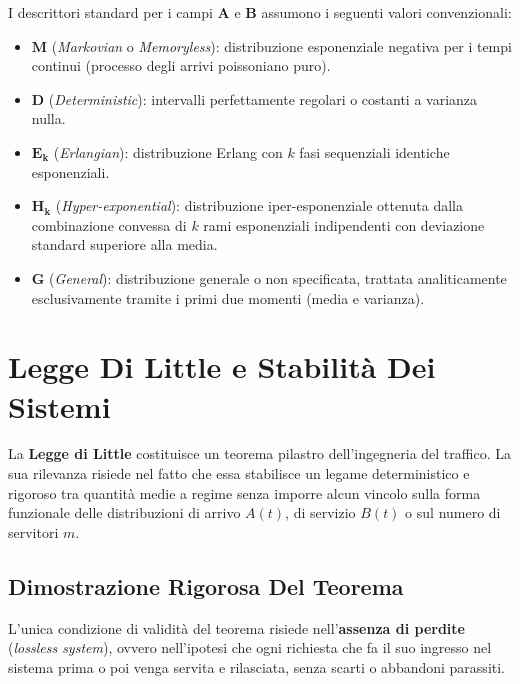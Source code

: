 \documentclass[11pt, a4paper]{article}
\begin{document}
I descrittori standard per i campi $\mathbf{A}$ e $\mathbf{B}$ assumono i seguenti valori convenzionali:
\begin{itemize}[leftmargin=*]
    \item $\mathbf{M}$ (\emph{Markovian} o \emph{Memoryless}): distribuzione esponenziale negativa per i tempi continui (processo degli arrivi poissoniano puro).
    \item $\mathbf{D}$ (\emph{Deterministic}): intervalli perfettamente regolari o costanti a varianza nulla.
    \item $\mathbf{E_k}$ (\emph{Erlangian}): distribuzione Erlang con $k$ fasi sequenziali identiche esponenziali.
    \item $\mathbf{H_k}$ (\emph{Hyper-exponential}): distribuzione iper-esponenziale ottenuta dalla combinazione convessa di $k$ rami esponenziali indipendenti con deviazione standard superiore alla media.
    \item $\mathbf{G}$ (\emph{General}): distribuzione generale o non specificata, trattata analiticamente esclusivamente tramite i primi due momenti (media e varianza).
\end{itemize}

\newpage


\section{Legge Di Little e Stabilit\`a Dei Sistemi}

La \textbf{Legge di Little} costituisce un teorema pilastro dell'ingegneria del traffico. La sua rilevanza risiede nel fatto che essa stabilisce un legame deterministico e rigoroso tra quantità medie a regime senza imporre alcun vincolo sulla forma funzionale delle distribuzioni di arrivo $A(t)$, di servizio $B(t)$ o sul numero di servitori $m$.

\subsection{Dimostrazione Rigorosa Del Teorema}

L'unica condizione di validità del teorema risiede nell'\textbf{assenza di perdite} (\emph{lossless system}), ovvero nell'ipotesi che ogni richiesta che fa il suo ingresso nel sistema prima o poi venga servita e rilasciata, senza scarti o abbandoni parassiti.

\end{document}
